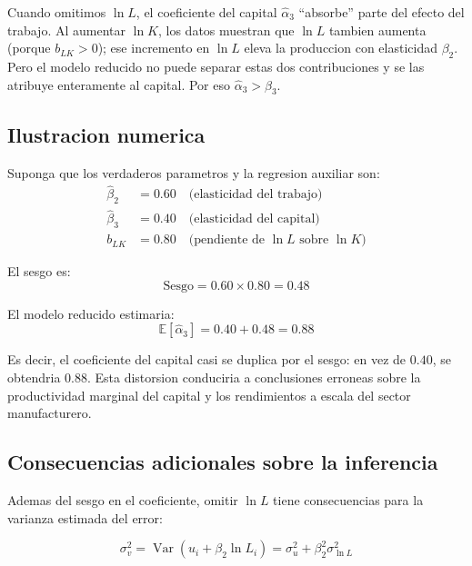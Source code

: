 \documentclass[12pt, letterpaper]{article}
\theoremstyle{remark}
\newcommand{\E}{\mathbb{E}}
\newcommand{\Var}{\operatorname{Var}}
\begin{document}
Cuando omitimos $\ln L$, el coeficiente del capital $\hat\alpha_3$
``absorbe'' parte del efecto del trabajo. Al aumentar $\ln K$, los
datos muestran que $\ln L$ tambien aumenta (porque $b_{LK} > 0$);
ese incremento en $\ln L$ eleva la produccion con elasticidad $\beta_2$.
Pero el modelo reducido no puede separar estas dos contribuciones y
se las atribuye enteramente al capital. Por eso $\hat\alpha_3 > \beta_3$.

\subsection{Ilustracion numerica}

Suponga que los verdaderos parametros y la regresion auxiliar son:
\begin{align}
  \hat\beta_2 &= 0.60 \quad \text{(elasticidad del trabajo)}\\
  \hat\beta_3 &= 0.40 \quad \text{(elasticidad del capital)}\\
  b_{LK}      &= 0.80 \quad \text{(pendiente de } \ln L \text{ sobre } \ln K\text{)}
\end{align}

El sesgo es:
\begin{equation}
  \text{Sesgo} = 0.60 \times 0.80 = 0.48
  \label{eq:sesgo_num}
\end{equation}

El modelo reducido estimaria:
\begin{equation}
  \E[\hat\alpha_3] = 0.40 + 0.48 = 0.88
  \label{eq:alpha3_num}
\end{equation}

Es decir, el coeficiente del capital casi se duplica por el sesgo: en vez
de $0.40$, se obtendria $0.88$. Esta distorsion conduciria a conclusiones
erroneas sobre la productividad marginal del capital y los rendimientos
a escala del sector manufacturero.

\subsection{Consecuencias adicionales sobre la inferencia}

Ademas del sesgo en el coeficiente, omitir $\ln L$ tiene consecuencias
para la varianza estimada del error:

\begin{equation}
  \sigma_v^2 = \Var(u_i + \beta_2 \ln L_i) = \sigma_u^2 + \beta_2^2 \sigma_{\ln L}^2
  \label{eq:var_error_reducido}
\end{equation}
\end{document}
